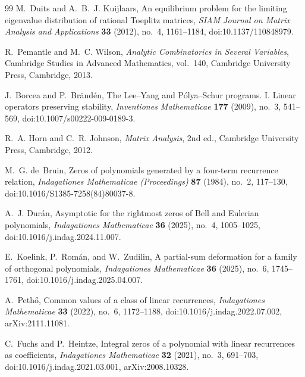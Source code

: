 \begin{thebibliography}{99}
M.~Duits and A.~B.~J. Kuijlaars,
\newblock An equilibrium problem for the limiting eigenvalue distribution of rational Toeplitz matrices,
\newblock \emph{SIAM Journal on Matrix Analysis and Applications} \textbf{33} (2012), no.~4, 1161--1184,
\newblock doi:10.1137/110848979.

R.~Pemantle and M.~C. Wilson,
\newblock \emph{Analytic Combinatorics in Several Variables},
\newblock Cambridge Studies in Advanced Mathematics, vol.~140, Cambridge University Press, Cambridge, 2013.

J.~Borcea and P.~Br\"and\'en,
\newblock The Lee--Yang and P\'olya--Schur programs. {I}. Linear operators preserving stability,
\newblock \emph{Inventiones Mathematicae} \textbf{177} (2009), no.~3, 541--569,
\newblock doi:10.1007/s00222-009-0189-3.

R.~A. Horn and C.~R. Johnson,
\newblock \emph{Matrix Analysis},
\newblock 2nd ed., Cambridge University Press, Cambridge, 2012.

M.~G. de~Bruin,
\newblock Zeros of polynomials generated by a four-term recurrence relation,
\newblock \emph{Indagationes Mathematicae (Proceedings)} \textbf{87} (1984), no.~2, 117--130,
\newblock doi:10.1016/S1385-7258(84)80037-8.

A.~J. Dur\'an,
\newblock Asymptotic for the rightmost zeros of {B}ell and {E}ulerian polynomials,
\newblock \emph{Indagationes Mathematicae} \textbf{36} (2025), no.~4, 1005--1025,
\newblock doi:10.1016/j.indag.2024.11.007.

E.~Koelink, P.~Rom\'an, and W.~Zudilin,
\newblock A partial-sum deformation for a family of orthogonal polynomials,
\newblock \emph{Indagationes Mathematicae} \textbf{36} (2025), no.~6, 1745--1761,
\newblock doi:10.1016/j.indag.2025.04.007.

A.~Peth\H{o},
\newblock Common values of a class of linear recurrences,
\newblock \emph{Indagationes Mathematicae} \textbf{33} (2022), no.~6, 1172--1188,
\newblock doi:10.1016/j.indag.2022.07.002, arXiv:2111.11081.

C.~Fuchs and P.~Heintze,
\newblock Integral zeros of a polynomial with linear recurrences as coefficients,
\newblock \emph{Indagationes Mathematicae} \textbf{32} (2021), no.~3, 691--703,
\newblock doi:10.1016/j.indag.2021.03.001, arXiv:2008.10328.


\end{thebibliography}

